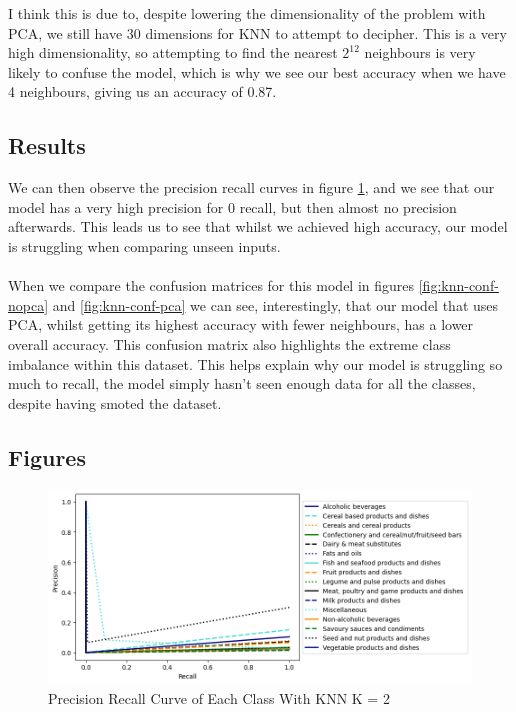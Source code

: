 \documentclass[12pt,a4paper]{article}
\begin{document}
    I think this is due to, despite lowering the dimensionality of the problem with PCA, we still have
    30 dimensions for KNN to attempt to decipher. This is a very high dimensionality, so attempting to
    find the nearest $2^{12}$ neighbours is very likely to confuse the model, which is why we see our
    best accuracy when we have 4 neighbours, giving us an accuracy of 0.87.

    \subsection{Results}
    We can then observe the precision recall curves in figure \ref{fig:knn-precision-recall},
    and we see that our model has a very high precision for 0 recall, but then
    almost no precision afterwards. This leads us to see that whilst we achieved high accuracy, our model
    is struggling when comparing unseen inputs.
    \\
    \\
    When we compare the confusion matrices for this model in figures \ref{fig:knn-conf-nopca} and \ref{fig:knn-conf-pca}
    we can see, interestingly, that our model that uses PCA, whilst getting its highest accuracy with
    fewer neighbours, has a lower overall accuracy. This confusion matrix also highlights the extreme
    class imbalance within this dataset. This helps explain why our model is struggling so much to recall,
    the model simply hasn't seen enough data for all the classes, despite having smoted the dataset.

    \clearpage
    \subsection{Figures}
    \begin{figure}[h]
        \centering
        \includegraphics[width=\textwidth]{knn-precision-recall}
        \caption{Precision Recall Curve of Each Class With KNN K = 2}
        \label{fig:knn-precision-recall}
    \end{figure}
\end{document}
